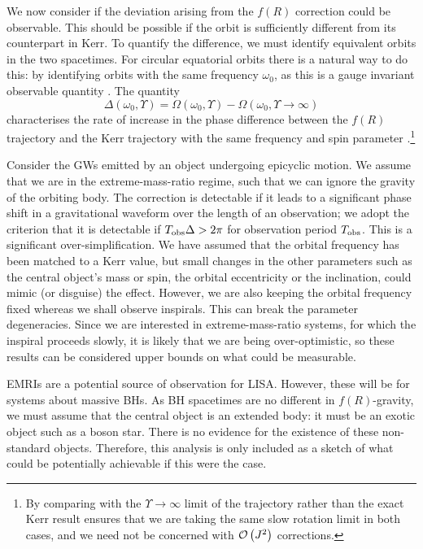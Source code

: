 We now consider if the deviation arising from the $f(R)$ correction could be observable. This should be possible if the orbit is sufficiently different from its counterpart in Kerr. To quantify the difference, we must identify equivalent orbits in the two spacetimes. For circular equatorial orbits there is a natural way to do this: by identifying orbits with the same frequency $\omega_0$, as this is a gauge invariant observable quantity \citep{Detweiler2008}. The quantity
\begin{equation}
\Delta(\omega_0,\Upsilon) = \Omega(\omega_0,\Upsilon) - \Omega(\omega_0,\Upsilon \rightarrow \infty)
\end{equation}
characterises the rate of increase in the phase difference between the $f(R)$ trajectory and the Kerr trajectory with the same frequency and spin parameter \citep{Berry2011}.\footnote{By comparing with the $\Upsilon \rightarrow\infty$ limit of the trajectory rather than the exact Kerr result ensures that we are taking the same slow rotation limit in both cases, and we need not be concerned with $\mathcal{O}\left({J^2}\right)$ corrections.}

Consider the GWs emitted by an object undergoing epicyclic motion. We assume that we are in the extreme-mass-ratio regime, such that we can ignore the gravity of the orbiting body. The correction is detectable if it leads to a significant phase shift in a gravitational waveform over the length of an observation; we adopt the criterion that it is detectable if $T_\mathrm{obs}\Delta > 2\pi$ for observation period $T_\mathrm{obs}$. This is a significant over-simplification. We have assumed that the orbital frequency has been matched to a Kerr value, but small changes in the other parameters such as the central object's mass or spin, the orbital eccentricity or the inclination, could mimic (or disguise) the effect. However, we are also keeping the orbital frequency fixed whereas we shall observe inspirals. This can break the parameter degeneracies. Since we are interested in extreme-mass-ratio systems, for which the inspiral proceeds slowly, it is likely that we are being over-optimistic, so these results can be considered upper bounds on what could be measurable.

EMRIs are a potential source of observation for LISA. However, these will be for systems about massive BHs. As BH spacetimes are no different in $f(R)$-gravity, we must assume that the central object is an extended body: it must be an exotic object such as a boson star. There is no evidence for the existence of these non-standard objects. Therefore, this analysis is only included as a sketch of what could be potentially achievable if this were the case.

